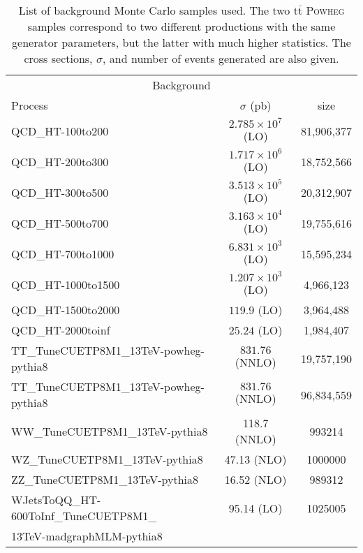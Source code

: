 {\begin{table}[h!]
\renewcommand{\arraystretch}{1.1}
  \begin{center}
    \begin{tabular}{l|c|c}
      \hline
      \hline
      \multicolumn{3}{c}{Background} \\ \cline{1-3}
      Process & $\sigma$ (pb) & size \\
      \hline
      {QCD\_HT-100to200}   & $2.785\times 10^7 $ (LO) & 81,906,377 \\
      {QCD\_HT-200to300}   & $1.717\times 10^6 $ (LO) & 18,752,566 \\
      {QCD\_HT-300to500}   & $3.513\times 10^5 $ (LO) & 20,312,907 \\
      {QCD\_HT-500to700}   & $3.163\times 10^4 $ (LO) & 19,755,616 \\
      {QCD\_HT-700to1000}  & $6.831\times 10^3$  (LO) & 15,595,234 \\
      {QCD\_HT-1000to1500} & $1.207\times 10^3$  (LO) & 4,966,123  \\
      {QCD\_HT-1500to2000} & $119.9 $            (LO) & 3,964,488  \\
      {QCD\_HT-2000toinf}  & $25.24 $            (LO) & 1,984,407  \\
      \hline
      {TT\_TuneCUETP8M1\_13TeV-powheg-pythia8} & $831.76$ (NNLO) & 19,757,190 \\
      {TT\_TuneCUETP8M1\_13TeV-powheg-pythia8} & $831.76$ (NNLO) & 96,834,559 \\
      \hline
      WW\_TuneCUETP8M1\_13TeV-pythia8 & 118.7 (NNLO) & 993214 \\
      \hline
      WZ\_TuneCUETP8M1\_13TeV-pythia8 & 47.13 (NLO) & 1000000 \\
      \hline
      ZZ\_TuneCUETP8M1\_13TeV-pythia8 &  16.52 (NLO) & 989312 \\
      \hline
      WJetsToQQ\_HT-600ToInf\_TuneCUETP8M1\_ & 95.14 (LO) & 1025005 \\
      13TeV-madgraphMLM-pythia8 & & \\
      \hline
      \hline
    \end{tabular}
  \caption{List of background Monte Carlo samples used. The two $\mathrm{t\bar{t}}$ \textsc{Powheg} samples correspond to two different productions with the same generator parameters, but the latter with much higher statistics. The cross sections, $\sigma$, and number of events generated are also given.\label{tab:bkg_MC}}
  \end{center}
\end{table}}

